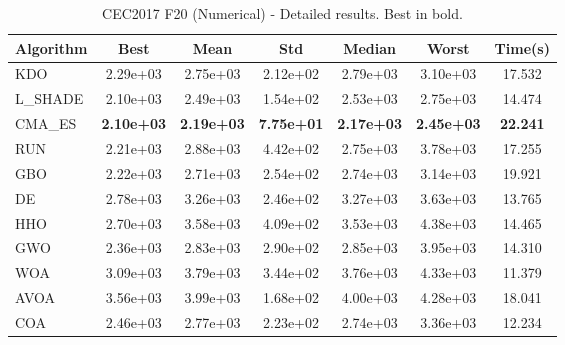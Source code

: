 \begin{table}[H]
\centering\small
\caption{CEC2017 F20 (Numerical) - Detailed results. Best in bold.}
\label{tab:cec2017_F20}
\begin{tabular}{lcccccc}
\toprule
\textbf{Algorithm} & \textbf{Best} & \textbf{Mean} & \textbf{Std} & \textbf{Median} & \textbf{Worst} & \textbf{Time(s)} \\
\midrule
KDO & 2.29e+03 & 2.75e+03 & 2.12e+02 & 2.79e+03 & 3.10e+03 & 17.532 \\
L_SHADE & 2.10e+03 & 2.49e+03 & 1.54e+02 & 2.53e+03 & 2.75e+03 & 14.474 \\
CMA_ES & \textbf{2.10e+03} & \textbf{2.19e+03} & \textbf{7.75e+01} & \textbf{2.17e+03} & \textbf{2.45e+03} & \textbf{22.241} \\
RUN & 2.21e+03 & 2.88e+03 & 4.42e+02 & 2.75e+03 & 3.78e+03 & 17.255 \\
GBO & 2.22e+03 & 2.71e+03 & 2.54e+02 & 2.74e+03 & 3.14e+03 & 19.921 \\
DE & 2.78e+03 & 3.26e+03 & 2.46e+02 & 3.27e+03 & 3.63e+03 & 13.765 \\
HHO & 2.70e+03 & 3.58e+03 & 4.09e+02 & 3.53e+03 & 4.38e+03 & 14.465 \\
GWO & 2.36e+03 & 2.83e+03 & 2.90e+02 & 2.85e+03 & 3.95e+03 & 14.310 \\
WOA & 3.09e+03 & 3.79e+03 & 3.44e+02 & 3.76e+03 & 4.33e+03 & 11.379 \\
AVOA & 3.56e+03 & 3.99e+03 & 1.68e+02 & 4.00e+03 & 4.28e+03 & 18.041 \\
COA & 2.46e+03 & 2.77e+03 & 2.23e+02 & 2.74e+03 & 3.36e+03 & 12.234 \\
\bottomrule
\end{tabular}
\end{table}
